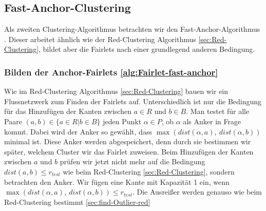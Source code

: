     \subsection{Fast-Anchor-Clustering} \label{sec:Fast-Anchor-Clustering}
        Als zweiten Clustering-Algorithmus betrachten wir den Fast-Anchor-Algorithmus \cite{BA_Clustering_Irina}. Dieser arbeitet ähnlich wie der Red-Clustering Algorithmus \ref{sec:Red-Clustering}, bildet aber die Fairlets nach einer grundlegend anderen Bedingung.

        \subsubsection{Bilden der Anchor-Fairlets \label{sec:fast-anchor-Fairlets} \ref{alg:Fairlet-fast-anchor}}
            Wie im Red-Clustering Algorithmus \ref{sec:Red-Clustering} bauen wir ein Flussnetzwerk zum Finden der Fairlets auf. Unterschiedlich ist nur die Bedingung für das Hinzufügen der Kanten zwischen $a \in R$ und $b \in B$. Man testet für alle Paare $(a, b) \in \{a \in R | b \in B\}$ jeden Punkt $\alpha \in P$, ob $\alpha$ als Anker in Frage kommt. Dabei wird der Anker so gewählt, dass $\max(dist(\alpha, a),\ dist(\alpha, b))$ minimal ist. \newline
            Diese Anker werden abgespeichert, denn durch sie bestimmen wir später, welchem Cluster wir das Fairlet zuweisen. \newline
            Beim Hinzufügen der Kanten zwischen $a$ und $b$ prüfen wir jetzt nicht mehr auf die Bedingung $dist(a, b) \leq r_{test}$ wie beim Red-Clustering \ref{sec:Red-Clustering}, sondern betrachten den Anker. Wir fügen eine Kante mit Kapazität 1 ein, wenn $\max(dist(\alpha, a),\ dist(\alpha, b)) \leq r_{test}$. \newline
            Die Ausreißer werden genauso wie beim Red-Clustering bestimmt \ref{sec:find-Outlier-red}


